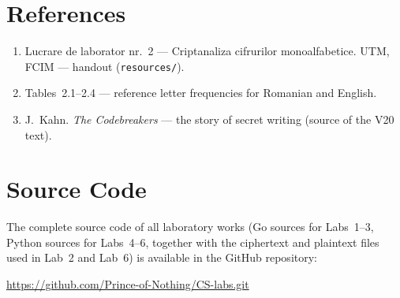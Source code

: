 \documentclass[12pt,a4paper]{article}
\begin{document}
\section*{References}

\begin{enumerate}
  \item Lucrare de laborator nr.~2 --- Criptanaliza cifrurilor monoalfabetice. UTM, FCIM --- handout (\texttt{resources/}).
  \item Tables~2.1--2.4 --- reference letter frequencies for Romanian and English.
  \item J.~Kahn. \textit{The Codebreakers} --- the story of secret writing (source of the V20 text).
\end{enumerate}

\section*{Source Code}

The complete source code of all laboratory works (Go sources for Labs~1--3, Python sources for Labs~4--6, together with the ciphertext and plaintext files used in Lab~2 and Lab~6) is available in the GitHub repository:

\begin{center}
  \url{https://github.com/Prince-of-Nothing/CS-labs.git}
\end{center}
\end{document}
